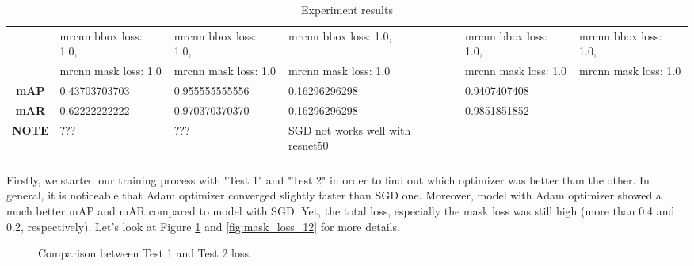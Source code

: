 \begin{longtable}[c]{|c|l|l|l|l|l|}
		& mrcnn bbox loss: 1.0, & mrcnn bbox loss: 1.0, & mrcnn bbox loss: 1.0, & mrcnn bbox loss: 1.0, & mrcnn bbox loss: 1.0, \\ \cline{2-6} 
		& \multirow{2}{*}{mrcnn mask loss: 1.0} & \multirow{2}{*}{mrcnn mask loss: 1.0} & \multirow{2}{*}{mrcnn mask loss: 1.0} & \multirow{2}{*}{mrcnn mask loss: 1.0} & \multirow{2}{*}{mrcnn mask loss: 1.0} \\
		&  &  &  &  &  \\ \hline
		\textbf{mAP} & 0.43703703703 & 0.955555555556 & 0.16296296298 & 0.9407407408 &  \\ \hline
		\textbf{mAR} & 0.62222222222 & 0.970370370370 & 0.16296296298 & 0.9851851852 &  \\ \hline
		\textbf{NOTE} & ??? & ??? & SGD not works well with resnet50 &  &  \\ \hline
	
	\caption{Experiment results}
	\label{table:exp2}
	\end{longtable}
	
	Firstly, we started our training process with "Test 1" and "Test 2" in order to find out which optimizer was better than the other. In general, it is noticeable that Adam optimizer converged slightly faster than SGD one. Moreover, model with Adam optimizer showed a much better mAP and mAR compared to model with SGD. Yet, the total loss, especially the mask loss was still high (more than 0.4 and 0.2, respectively). Let's look at Figure \ref{fig:loss_12} and \ref{fig:mask_loss_12} for more details.
	
	\begin{figure}[H]
		\centering
		\hfill %
		\hfill %
		\caption{Comparison between Test 1 and Test 2 loss.}
		\label{fig:loss_12}
	\end{figure}
	
